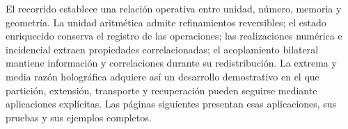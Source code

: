 El recorrido establece una relación operativa entre unidad,
número, memoria y geometría. La unidad aritmética admite
refinamientos reversibles; el estado enriquecido conserva el
registro de las operaciones; las realizaciones numérica e
incidencial extraen propiedades correlacionadas; el acoplamiento
bilateral mantiene información y correlaciones durante su
redistribución. La extrema y media razón holográfica adquiere así
un desarrollo demostrativo en el que partición, extensión,
transporte y recuperación pueden seguirse mediante aplicaciones
explícitas. Las páginas siguientes presentan esas aplicaciones,
sus pruebas y sus ejemplos completos.

